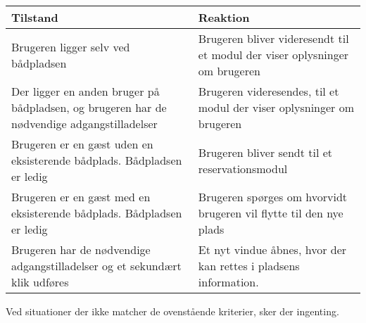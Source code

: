 \begin{tabu} to \textwidth {XX}
  \toprule
  \textbf{Tilstand} & \textbf{Reaktion} \\
   \midrule
   Brugeren ligger selv ved bådpladsen & Brugeren bliver videresendt til et modul der viser oplysninger om brugeren \\
   \midrule
  Der ligger en anden bruger på bådpladsen, og brugeren har de nødvendige adgangstilladelser & Brugeren videresendes, til et modul der viser oplysninger om brugeren \\
  \midrule
   Brugeren er en gæst uden en eksisterende bådplads. Bådpladsen er ledig & Brugeren bliver sendt til et reservationsmodul \\ 
   \midrule
   Brugeren er en gæst med en eksisterende bådplads. Bådpladsen er ledig & Brugeren spørges om hvorvidt brugeren vil flytte til den nye plads \\
   \midrule
   Brugeren har de nødvendige adgangstilladelser og et sekundært klik udføres & Et nyt vindue åbnes, hvor der kan rettes i pladsens information. \\
   \bottomrule 
\end{tabu}
Ved situationer der ikke matcher de ovenstående kriterier, sker der ingenting.


